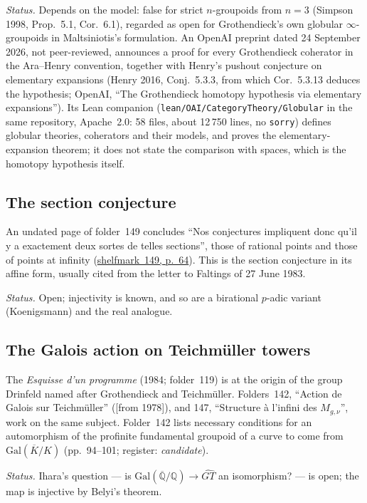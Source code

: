 \documentclass[11pt,a4paper]{article}
\newcommand{\lot}[3]{\href{https://grothendieck.commutator.io/\##1/#2}{shelfmark~#1, p.~#3}}
\newcommand{\q}[1]{“#1”}
\begin{document}
\emph{Status.} Depends on the model: false for strict $n$-groupoids from
$n = 3$ (Simpson 1998, Prop.~5.1, Cor.~6.1), regarded as open for Grothendieck's own globular
$\infty$-groupoids in Maltsiniotis's formulation. An OpenAI preprint dated 24 September 2026, not peer-reviewed, announces a proof for every Grothendieck coherator in the Ara--Henry convention, together with Henry's pushout conjecture on elementary expansions (Henry 2016, Conj.~5.3.3, from which Cor.~5.3.13 deduces the hypothesis; OpenAI, \q{The Grothendieck homotopy hypothesis via elementary expansions}). Its Lean companion (\texttt{lean/OAI/CategoryTheory/Globular} in the same repository, Apache~2.0: 58 files, about 12\,750 lines, no \texttt{sorry}) defines globular theories, coherators and their models, and proves the elementary-expansion theorem; it does not state the comparison with spaces, which is the homotopy hypothesis itself.

\subsection{The section conjecture}
An undated page of folder~149 concludes \q{Nos conjectures impliquent donc
qu'il y a exactement deux sortes de telles sections}, those of rational points
and those of points at infinity (\lot{149}{4}{64}). This is the section
conjecture in its affine form, usually cited from the letter to Faltings of
27 June 1983.

\emph{Status.} Open; injectivity is known, and so are a birational $p$-adic
variant (Koenigsmann) and the real analogue.

\subsection{The Galois action on Teichmüller towers}
The \emph{Esquisse d'un programme} (1984; folder~119) is at the origin of the
group Drinfeld named after Grothendieck and Teichmüller. Folders~142,
\q{Action de Galois sur Teichmüller} ([from 1978]), and 147, \q{Structure à
l'infini des $M_{g,\nu}$}, work on the same subject. Folder~142 lists
necessary conditions for an automorphism of the profinite fundamental groupoid
of a curve to come from $\mathrm{Gal}(\overline K/K)$ (pp.~94--101; register:
\emph{candidate}).

\emph{Status.} Ihara's question --- is $\mathrm{Gal}(\overline{\mathbb Q}/\mathbb Q)
\to \widehat{GT}$ an isomorphism? --- is open; the map is injective by Belyi's
theorem.
\end{document}
